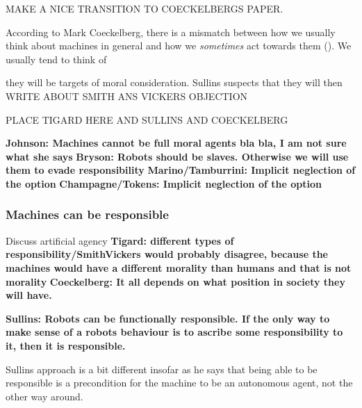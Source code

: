 \documentclass{article}
\begin{document}
MAKE A NICE TRANSITION TO COECKELBERGS PAPER.

According to Mark Coeckelberg, there is a mismatch between how we usually think
about machines in general and how we \textit{sometimes} act towards them
(\cite[p. 61]{coeckelbergh2014moral}). We usually tend to think of 

they will be targets of moral
consideration. Sullins suspects that they will then 
WRITE ABOUT
SMITH ANS VICKERS OBJECTION
  




PLACE TIGARD HERE AND SULLINS AND COECKELBERG

\textbf{Johnson: Machines cannot be full moral agents bla bla, I am not sure what she
says}
\textbf{Bryson: Robots should be slaves. Otherwise we will use them to evade
responsibility}
\textbf{Marino/Tamburrini: Implicit neglection of the option}
\textbf{Champagne/Tokens: Implicit neglection of the option}


\subsubsection{Machines can be responsible}
Discuss artificial agency
\textbf{Tigard: different types of responsibility/SmithVickers would probably
disagree, because the machines would have a different morality than humans and
that is not morality}
\textbf{Coeckelberg: It all depends on what position in society they will have.}

\textbf{Sullins: Robots can be functionally responsible. If the only way to make sense
of a robots behaviour is to ascribe some responsibility to it, then it is
responsible.}

Sullins approach is a bit different insofar as he says that being able to be
responsible is a precondition for the machine to be an autonomous agent, not the
other way around. 
\end{document}
